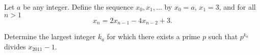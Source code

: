 Let $a$ be any integer. Define the sequence $x_0,x_1,\ldots$ by $x_0=a$,  $x_1=3$,  and for all $n>1$\[x_n=2x_{n-1}-4x_{n-2}+3.\]

Determine the largest integer $k_a$ for which there exists a prime $p$ such that $p^{k_a}$ divides $x_{2011}-1$.